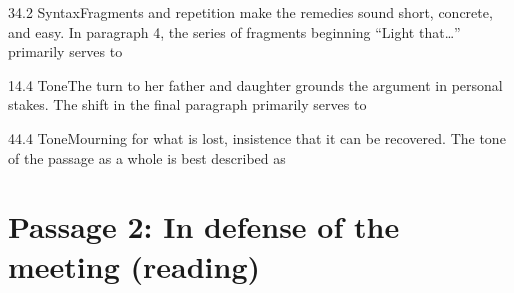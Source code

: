 \documentclass[11pt]{article}
\begin{document}
\begin{q}{3}{4.2 Syntax}{Fragments and repetition make the remedies sound short, concrete, and easy.}
In paragraph 4, the series of fragments beginning ``Light that\ldots'' primarily serves to
\end{q}

\begin{q}{1}{4.4 Tone}{The turn to her father and daughter grounds the argument in personal stakes.}
The shift in the final paragraph primarily serves to
\end{q}

\begin{q}{4}{4.4 Tone}{Mourning for what is lost, insistence that it can be recovered.}
The tone of the passage as a whole is best described as
\end{q}

\section{Passage 2: In defense of the meeting (reading)}
\end{document}
